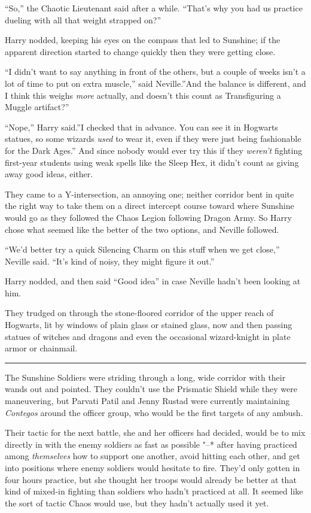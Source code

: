 ``So,'' the Chaotic Lieutenant said after a while. ``That's why you had
us practice dueling with all that weight strapped on?''

Harry nodded, keeping his eyes on the compass that led to Sunshine; if
the apparent direction started to change quickly then they were getting
close.

``I didn't want to say anything in front of the others, but a couple of
weeks isn't a lot of time to put on extra muscle,'' said Neville.''And
the balance is different, and I think this weighs \emph{more} actually,
and doesn't this count as Transfiguring a Muggle artifact?''

``Nope,'' Harry said.''I checked that in advance. You can see it in
Hogwarts statues, so some wizards \emph{used} to wear it, even if they
were just being fashionable for the Dark Ages.'' And since nobody would
ever try this if they \emph{weren't} fighting first-year students using
weak spells like the Sleep Hex, it didn't count as giving away good
ideas, either.

They came to a Y-intersection, an annoying one; neither corridor bent in
quite the right way to take them on a direct intercept course toward
where Sunshine would go as they followed the Chaos Legion following
Dragon Army. So Harry chose what seemed like the better of the two
options, and Neville followed.

``We'd better try a quick Silencing Charm on this stuff when we get
close,'' Neville said. ``It's kind of noisy, they might figure it out.''

Harry nodded, and then said ``Good idea'' in case Neville hadn't been
looking at him.

They trudged on through the stone-floored corridor of the upper reach of
Hogwarts, lit by windows of plain glass or stained glass, now and then
passing statues of witches and dragons and even the occasional
wizard-knight in plate armor or chainmail.

\begin{center}\rule{3in}{0.4pt}\end{center}

The Sunshine Soldiers were striding through a long, wide corridor with
their wands out and pointed. They couldn't use the Prismatic Shield
while they were maneuvering, but Parvati Patil and Jenny Rustad were
currently maintaining \emph{Contegos} around the officer group, who
would be the first targets of any ambush.

Their tactic for the next battle, she and her officers had decided,
would be to mix directly in with the enemy soldiers as fast as possible
"--* after having practiced among \emph{themselves} how to support one
another, avoid hitting each other, and get into positions where enemy
soldiers would hesitate to fire. They'd only gotten in four hours
practice, but she thought her troops would already be better at that
kind of mixed-in fighting than soldiers who hadn't practiced at all. It
seemed like the sort of tactic Chaos would use, but they hadn't actually
used it yet.

